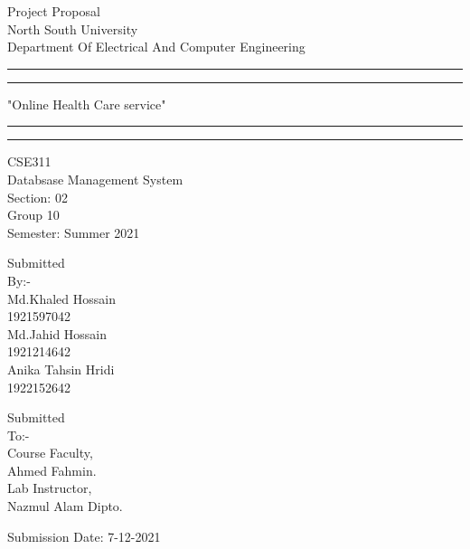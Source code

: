 \documentclass[a4paper,11pt]{paper}
\begin{document}
\begin{titlepage}
	\centering
	\scshape 
	
	{\LARGE Project Proposal\\}
	North South University\\ Department Of Electrical And Computer Engineering\\
	
	\rule{\textwidth}{1.6pt}\vspace*{-\baselineskip}\vspace*{2pt}
	\rule{\textwidth}{1.6pt}
	\vspace{0.5\baselineskip}
	
	{\LARGE "Online Health Care service"\\}
	\vspace{0.5\baselineskip}
	\rule{\textwidth}{0.4pt}\vspace*{-\baselineskip}\vspace{3.2pt}
	\rule{\textwidth}{1.6pt}
	
	
	
	 {\LARGE CSE311\\Databsase Management System\\}
	 Section: 02\\Group 10\\
	 {\LARGE Semester: Summer 2021\\} 
	 
	 \vspace{2\baselineskip}
	 {\LARGE Submitted\\}
	  By:-\\ 
	 Md.Khaled Hossain\\ 1921597042\\ Md.Jahid Hossain\\ 1921214642\\ Anika Tahsin Hridi\\ 1922152642
	 
	 \vspace{2\baselineskip}
	 {\LARGE Submitted\\} 
	 To:-\\
	 Course Faculty,\\Ahmed Fahmin.\\ Lab Instructor,\\ Nazmul Alam Dipto.
	 
	  \vspace{1\baselineskip}
	  Submission Date: 7-12-2021
	 
\end{titlepage}
\end{document}

